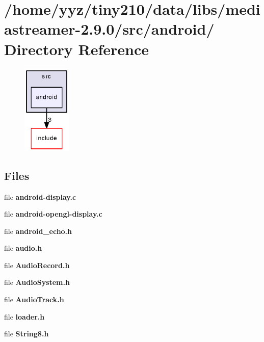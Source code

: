 \section{/home/yyz/tiny210/data/libs/mediastreamer-\/2.9.0/src/android/ Directory Reference}
\label{dir_b3a9050ec85a7b56dfb1c73de4a21591}


\nopagebreak
\begin{figure}[H]
\begin{center}
\leavevmode
\includegraphics[width=65pt]{dir_b3a9050ec85a7b56dfb1c73de4a21591_dep}
\end{center}
\end{figure}
\subsection*{Files}
\begin{DoxyCompactItemize}
\item 
file {\bfseries android-\/display.c}
\item 
file {\bfseries android-\/opengl-\/display.c}
\item 
file {\bfseries android\_\-echo.h}
\item 
file {\bfseries audio.h}
\item 
file {\bfseries AudioRecord.h}
\item 
file {\bfseries AudioSystem.h}
\item 
file {\bfseries AudioTrack.h}
\item 
file {\bfseries loader.h}
\item 
file {\bfseries String8.h}
\end{DoxyCompactItemize}
